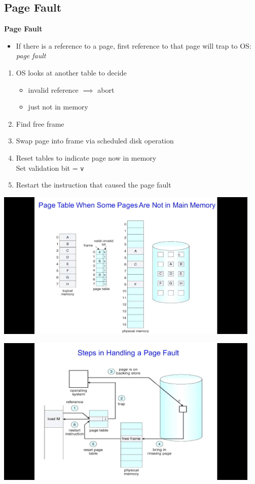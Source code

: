 \documentclass[11pt,a4paper]{article}
\begin{document}
\subsection{Page Fault}

\textbf{Page Fault}
\begin{itemize}
    \item If there is a reference to a page, first reference to that page will trap to OS:\ \\
        \emph{page fault}
\end{itemize}
\begin{enumerate}
    \item OS looks at another table to decide
        \begin{itemize}
            \item invalid reference $\implies$ abort
            \item just not in memory
        \end{itemize}
    \item Find free frame
    \item Swap page into frame via scheduled disk operation
    \item Reset tables to indicate page now in memory \\
        Set validation bit = \texttt{v}
    \item Restart the instruction that caused the page fault
\end{enumerate}

\includegraphics[height=270]{page-table-when-some-pages-are-not-in-main-memory.jpg}

\includegraphics[height=270]{steps-in-handling-a-page-fault.jpg}
\end{document}
